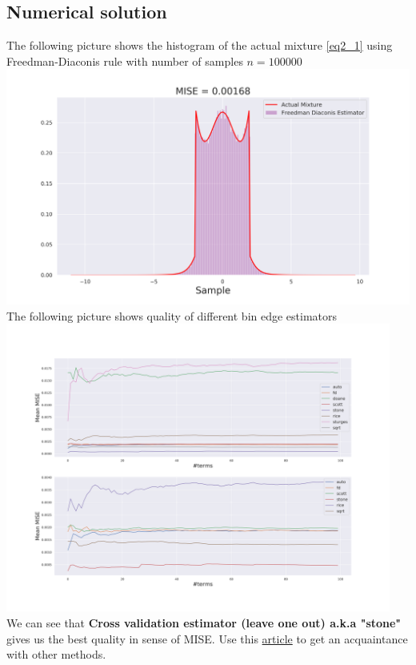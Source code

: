 \documentclass[a4paper, 12pt]{article}
\begin{document}
\subsection{Numerical solution}
The following picture shows the histogram of the actual mixture \eqref{eq2_1} using Freedman-Diaconis rule with number of samples $n=100000$ \\
\includegraphics[width=\textwidth]{Images/Task2_1.png}
The following picture shows quality of different bin edge estimators \\
\includegraphics[width=\textwidth, height=9.5cm]{Images/Task2_2.png}\\
We can see that \textbf{Cross validation estimator (leave one out) a.k.a "stone"} gives us the best quality in sense of MISE. Use this \href{https://numpy.org/devdocs/reference/generated/numpy.histogram_bin_edges.html}{article} to get an acquaintance with other methods.
\end{document}
